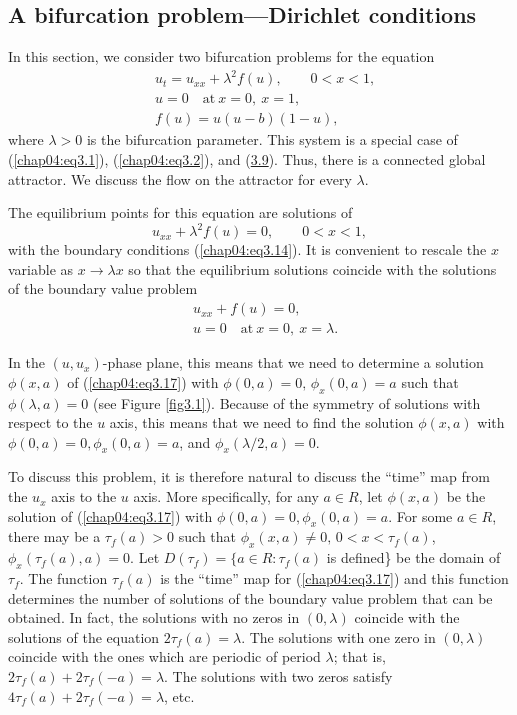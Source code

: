 \documentclass{surv-l}
\theoremstyle{plain}
\theoremstyle{definition}
\numberwithin{equation}{section}
\numberwithin{figure}{chapter}
\begin{document}
\subsection{A bifurcation problem---Dirichlet conditions}\label{subsec4.3.4} In this section, we consider two bifurcation problems for the equation
\begin{align}\label{chap04:eq3.13}
&u_{t}=u_{xx}+\lambda^{2}f(u),\qquad0<x<1,\\
&u=0\quad \mathrm{at}\ x=0,\ x=1,\label{chap04:eq3.14}\\
&f(u)=u(u-b)(1-u),\label{chap04:eq3.15}
\end{align}
where $\lambda>0$ is the bifurcation parameter. This system is a special case of (\ref{chap04:eq3.1}), (\ref{chap04:eq3.2}), and (\hyperref[chap04:eq3.9]{3.9}). Thus, there is a connected global attractor. We discuss the flow on the attractor for every $\lambda$.

The equilibrium points for this equation are solutions of
\begin{equation}\label{chap04:eq3.16}
u_{xx}+\lambda^{2}f(u)=0,\qquad 0<x<1,
\end{equation}
with the boundary conditions (\ref{chap04:eq3.14}). It is convenient to rescale the $x$ variable as $x\rightarrow\lambda x$ so that the equilibrium solutions coincide with the solutions of the boundary value problem
\begin{align}\label{chap04:eq3.17}
&u_{xx}+f(u)=0,\\
&u=0\quad \mathrm{at}\ x=0,\ x=\lambda.\label{chap04:eq3.18}
\end{align}

In the $(u, u_{x})$-phase plane, this means that we need to determine a solution $\phi(x, a)$ of (\ref{chap04:eq3.17}) with $\phi(0, a)=0,\, \phi_{x}(0, a)=a$ such that $\phi(\lambda, a)=0$ (see Figure \ref{fig3.1}). Because of the symmetry of solutions with respect to the $u$ axis, this means that we need to find the solution $\phi(x, a)$ with $\phi(0, a)=0, \phi_{x}(0, a)=a$, and $\phi_{x}(\lambda/2, a)=0$.

To discuss this problem, it is therefore natural to discuss the ``time'' map from the $u_{x}$ axis to the $u$ axis. More specifically, for any $a\in R$, let $\phi(x, a)$ be the solution of (\ref{chap04:eq3.17}) with $\phi(0, a)=0, \phi_{x}(0, a)=a$. For some $a\in R$, there may be a $\tau_{f}(a)>0$ such that $\phi_{x}(x, a)\neq 0,\,0<x<\tau_{f}(a)$, $\phi_{x}(\tau_{f}(a), a)=0$. Let $D(\tau_{f})=\{a\in R\!:\tau_{f}(a)$ is defined\} be the domain of $\tau_{f}$. The function $\tau_{f}(a)$ is the ``time'' map for (\ref{chap04:eq3.17}) and this function determines the number of solutions of the boundary value problem that can be obtained. In fact, the solutions with no zeros in $(0, \lambda)$ coincide with the solutions of the equation $ 2\tau_{f} (a)=\lambda$. The solutions with one zero in $(0, \lambda)$ coincide with the ones which are periodic of period $\lambda$; that is, $ 2\tau_{f}(a)+2\tau_{f}(-a)=\lambda$. The solutions with two zeros satisfy $ 4\tau_{f}(a)+2\tau_{f}(-a)=\lambda$, etc.
\end{document}
